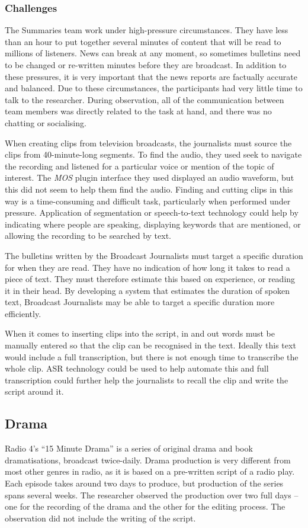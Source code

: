 \subsubsection{Challenges}

The Summaries team work under high-pressure circumstances. They have less than an hour to put together several minutes
of content that will be read to millions of listeners. News can break at any moment, so sometimes bulletins need to be
changed or re-written minutes before they are broadcast. In addition to these pressures, it is very important that the
news reports are factually accurate and balanced.  Due to these circumstances, the participants had very little time to
talk to the researcher. During observation, all of the communication between team members was directly related to the
task at hand, and there was no chatting or socialising.

When creating clips from television broadcasts, the journalists must source the clips from 40-minute-long segments.  To
find the audio, they used seek to navigate the recording and listened for a particular voice or mention of the topic of
interest.  The \textit{MOS} plugin interface they used displayed an audio waveform, but this did not seem to help them
find the audio.  Finding and cutting clips in this way is a time-consuming and difficult task, particularly when
performed under pressure.  Application of segmentation or speech-to-text technology could help by indicating where
people are speaking, displaying keywords that are mentioned, or allowing the recording to be searched by text.

The bulletins written by the Broadcast Journalists must target a specific duration for when they are read.  They have
no indication of how long it takes to read a piece of text. They must therefore estimate this based on experience, or
reading it in their head.  By developing a system that estimates the duration of spoken text, Broadcast Journalists may
be able to target a specific duration more efficiently. 

When it comes to inserting clips into the script, in and out words must be manually entered so that the clip can be
recognised in the text. Ideally this text would include a full transcription, but there is not enough time to
transcribe the whole clip.  ASR technology could be used to help automate this and full transcription could further
help the journalists to recall the clip and write the script around it.

\subsection{Drama}\label{sec:drama}
Radio 4's ``15 Minute Drama'' is a series of original drama and book dramatisations, broadcast twice-daily. Drama
production is very different from most other genres in radio, as it is based on a pre-written script of a radio play.
Each episode takes around two days to produce, but production of the series spans several weeks.  The researcher
observed the production over two full days -- one for the recording of the drama and the other for the editing process.
The observation did not include the writing of the script.

